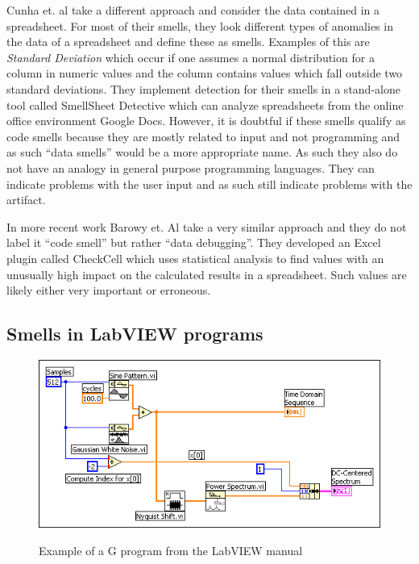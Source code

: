\documentclass[10pt,conference,compsocconf]{IEEEtran}
\begin{document}
Cunha et. al \cite{cunha2012towards} take a different approach and  consider the data contained in a spreadsheet.
For most of their smells, they look different types of anomalies in the data of a spreadsheet and define these as smells. 
Examples of this are \textit{Standard Deviation} which occur if one assumes a normal distribution for a column in numeric values and the column contains values which fall outside two standard deviations.
They implement detection for their smells in a stand-alone tool called SmellSheet Detective which can analyze spreadsheets from the online office environment Google Docs.
However, it is doubtful if these smells qualify as code smells because they are mostly related to input and not programming and as such ``data smells'' would be a more appropriate name. As such they also do not have an analogy in general purpose programming languages.
They can indicate problems with the user input and as such still indicate problems with the artifact.

In more recent work Barowy et. Al \cite{barowy2014checkcell} take a very similar approach and they do not label it ``code smell'' but rather ``data debugging''. They developed an Excel plugin called CheckCell which uses statistical analysis to find values with an unusually high impact on the calculated results in a spreadsheet.
Such values are likely either very important or erroneous.

\subsection{Smells in LabVIEW programs}

\begin{figure}
\caption{Example of a G program from the LabVIEW manual}
\centering
\includegraphics[width=\columnwidth]{labview-1}
\label{fig:labviewexample}
\end{figure}
\end{document}
